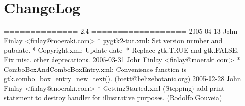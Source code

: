 \chapter{ChangeLog}
============== 2.4 ==================
2005-04-13 John Finlay <finlay@moeraki.com>
* pygtk2-tut.xml: Set version number and pubdate.
* Copyright.xml: Update date.
* Replace gtk.TRUE and gtk.FALSE. Fix misc. other deprecations.
2005-03-31 John Finlay <finlay@moeraki.com>
* ComboBoxAndComboBoxEntry.xml: Convenience function is
gtk.combo_box_entry_new_text(). (brett@belizebotanic.org)
2005-02-28 John Finlay <finlay@moeraki.com>
* GettingStarted.xml (Stepping) add print statement to destroy
handler for illustrative purposes. (Rodolfo Gouveia)

